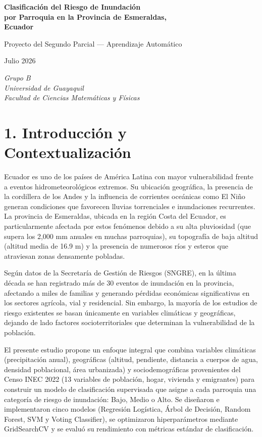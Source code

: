 \documentclass[12pt,a4paper]{article}
\begin{document}
\begin{titlepage}
\centering
\vspace*{3cm}
{\LARGE\bfseries Clasificación del Riesgo de Inundación\\ por Parroquia en la Provincia de Esmeraldas,\\ Ecuador\par}
\vspace{1.5cm}
{\Large Proyecto del Segundo Parcial --- Aprendizaje Automático\par}
\vspace{0.8cm}
{\large Julio 2026\par}
\vspace{1cm}
{\large\itshape Grupo B\\
Universidad de Guayaquil\\
Facultad de Ciencias Matemáticas y Físicas\par}
\end{titlepage}

\section{1. Introducción y Contextualización}

Ecuador es uno de los países de América Latina con mayor vulnerabilidad frente a eventos hidrometeorológicos extremos. Su ubicación geográfica, la presencia de la cordillera de los Andes y la influencia de corrientes oceánicas como El Niño generan condiciones que favorecen lluvias torrenciales e inundaciones recurrentes. La provincia de Esmeraldas, ubicada en la región Costa del Ecuador, es particularmente afectada por estos fenómenos debido a su alta pluviosidad (que supera los 2,000 mm anuales en muchas parroquias), su topografía de baja altitud (altitud media de 16.9 m) y la presencia de numerosos ríos y esteros que atraviesan zonas densamente pobladas.

Según datos de la Secretaría de Gestión de Riesgos (SNGRE), en la última década se han registrado más de 30 eventos de inundación en la provincia, afectando a miles de familias y generando pérdidas económicas significativas en los sectores agrícola, vial y residencial. Sin embargo, la mayoría de los estudios de riesgo existentes se basan únicamente en variables climáticas y geográficas, dejando de lado factores socioterritoriales que determinan la vulnerabilidad de la población.

El presente estudio propone un enfoque integral que combina variables climáticas (precipitación anual), geográficas (altitud, pendiente, distancia a cuerpos de agua, densidad poblacional, área urbanizada) y sociodemográficas provenientes del Censo INEC 2022 (13 variables de población, hogar, vivienda y emigrantes) para construir un modelo de clasificación supervisada que asigne a cada parroquia una categoría de riesgo de inundación: Bajo, Medio o Alto. Se diseñaron e implementaron cinco modelos (Regresión Logística, Árbol de Decisión, Random Forest, SVM y Voting Classifier), se optimizaron hiperparámetros mediante GridSearchCV y se evaluó su rendimiento con métricas estándar de clasificación.
\end{document}
